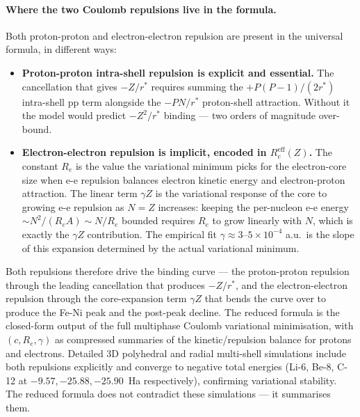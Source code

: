 \documentclass[11pt]{article}
\begin{document}
\paragraph{Where the two Coulomb repulsions live in the formula.}
Both proton-proton and electron-electron repulsion are present in the universal formula, in different ways:
\begin{itemize}
\item \textbf{Proton-proton intra-shell repulsion is explicit and essential.} The cancellation that gives $-Z/r^*$ requires summing the $+P(P-1)/(2 r^*)$ intra-shell pp term alongside the $-PN/r^*$ proton-shell attraction. Without it the model would predict $-Z^2/r^*$ binding --- two orders of magnitude over-bound.
\item \textbf{Electron-electron repulsion is implicit, encoded in $R_e^\text{eff}(Z)$.} The constant $R_e$ is the value the variational minimum picks for the electron-core size when e-e repulsion balances electron kinetic energy and electron-proton attraction. The linear term $\gamma Z$ is the variational response of the core to growing e-e repulsion as $N = Z$ increases: keeping the per-nucleon e-e energy $\sim N^2/(R_e A) \sim N/R_e$ bounded requires $R_e$ to grow linearly with $N$, which is exactly the $\gamma Z$ contribution. The empirical fit $\gamma \approx 3$--$5 \times 10^{-4}$ a.u.\ is the slope of this expansion determined by the actual variational minimum.
\end{itemize}
Both repulsions therefore drive the binding curve --- the proton-proton repulsion through the leading cancellation that produces $-Z/r^*$, and the electron-electron repulsion through the core-expansion term $\gamma Z$ that bends the curve over to produce the Fe-Ni peak and the post-peak decline. The reduced formula is the closed-form output of the full multiphase Coulomb variational minimisation, with $(c, R_e, \gamma)$ as compressed summaries of the kinetic/repulsion balance for protons and electrons. Detailed 3D polyhedral and radial multi-shell simulations include both repulsions explicitly and converge to negative total energies (Li-6, Be-8, C-12 at $-9.57, -25.88, -25.90$~Ha respectively), confirming variational stability. The reduced formula does not contradict these simulations --- it summarises them.
\end{document}

